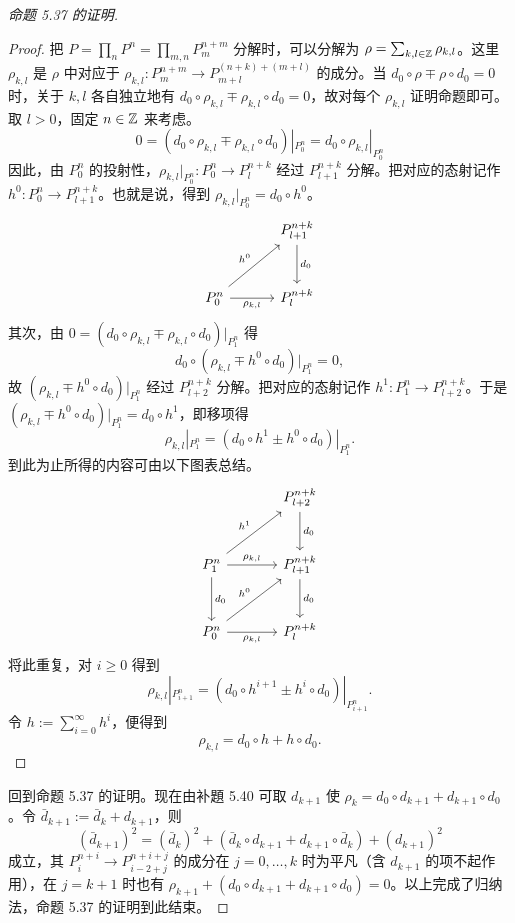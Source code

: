 \begin{proof}[命题 5.37 的证明]
\begin{proof}
把 $P=\prod_n P^n=\prod_{m,n}P_m^{n+m}$ 分解时，可以分解为 $\rho=\sum_{k,l\in\mathbb{Z}}\rho_{k,l}$。这里 $\rho_{k,l}$ 是 $\rho$ 中对应于 $\rho_{k,l}\colon P_m^{n+m}\to P_{m+l}^{(n+k)+(m+l)}$ 的成分。当 $d_0\circ\rho\mp\rho\circ d_0=0$ 时，关于 $k,l$ 各自独立地有 $d_0\circ\rho_{k,l}\mp\rho_{k,l}\circ d_0=0$，故对每个 $\rho_{k,l}$ 证明命题即可。
取 $l>0$，固定 $n\in\mathbb{Z}$ 来考虑。
\[
  0=(d_0\circ\rho_{k,l}\mp\rho_{k,l}\circ d_0)|_{P_0^n}=d_0\circ\rho_{k,l}|_{P_0^n}
\]
因此，由 $P_0^n$ 的投射性，$\rho_{k,l}|_{P_0^n}\colon P_0^n\to P_l^{n+k}$ 经过 $P_{l+1}^{n+k}$ 分解。把对应的态射记作 $h^0\colon P_0^n\to P_{l+1}^{n+k}$。也就是说，得到 $\rho_{k,l}|_{P_0^n}=d_0\circ h^0$。
\[\begin{tikzcd}[row sep=2.8em, column sep=3.2em]
 & P_{l+1}^{n+k} \arrow[d,"d_0"]\\
P_0^n \arrow[ur,"h^0"] \arrow[r,"\rho_{k,l}"'] & P_l^{n+k}
\end{tikzcd}\]
其次，由 $0=(d_0\circ\rho_{k,l}\mp\rho_{k,l}\circ d_0)|_{P_1^n}$ 得
\[
  d_0\circ(\rho_{k,l}\mp h^0\circ d_0)|_{P_1^n}=0,
\]
故 $(\rho_{k,l}\mp h^0\circ d_0)|_{P_1^n}$ 经过 $P_{l+2}^{n+k}$ 分解。把对应的态射记作 $h^1\colon P_1^n\to P_{l+2}^{n+k}$。于是 $(\rho_{k,l}\mp h^0\circ d_0)|_{P_1^n}=d_0\circ h^1$，即移项得
\[
  \rho_{k,l}|_{P_1^n}=(d_0\circ h^1\pm h^0\circ d_0)|_{P_1^n}.
\]
到此为止所得的内容可由以下图表总结。
\[\begin{tikzcd}[row sep=2.8em, column sep=3.6em]
 & P_{l+2}^{n+k} \arrow[d,"d_0"]\\
P_1^n \arrow[ur,"h^1"] \arrow[r,"\rho_{k,l}"] \arrow[d,"d_0"] & P_{l+1}^{n+k} \arrow[d,"d_0"]\\
P_0^n \arrow[ur,"h^0"] \arrow[r,"\rho_{k,l}"'] & P_l^{n+k}
\end{tikzcd}\]
将此重复，对 $i\ge 0$ 得到
\[
  \rho_{k,l}|_{P_{i+1}^n}=(d_0\circ h^{i+1}\pm h^i\circ d_0)|_{P_{i+1}^n}.
\]
令 $h:=\sum_{i=0}^\infty h^i$，便得到
\[
  \rho_{k,l}=d_0\circ h+h\circ d_0.
\]
\end{proof}

回到命题 5.37 的证明。现在由补題 5.40 可取 $d_{k+1}$ 使 $\rho_k=d_0\circ d_{k+1}+d_{k+1}\circ d_0$。令 $\bar d_{k+1}:=\bar d_k+d_{k+1}$，则
\[
  (\bar d_{k+1})^2=(\bar d_k)^2+(\bar d_k\circ d_{k+1}+d_{k+1}\circ\bar d_k)+(d_{k+1})^2
\]
成立，其 $P_i^{n+i}\to P_{i-2+j}^{n+i+j}$ 的成分在 $j=0,\ldots,k$ 时为平凡（含 $d_{k+1}$ 的项不起作用），在 $j=k+1$ 时也有 $\rho_{k+1}+(d_0\circ d_{k+1}+d_{k+1}\circ d_0)=0$。以上完成了归纳法，命题 5.37 的证明到此结束。
\end{proof}

